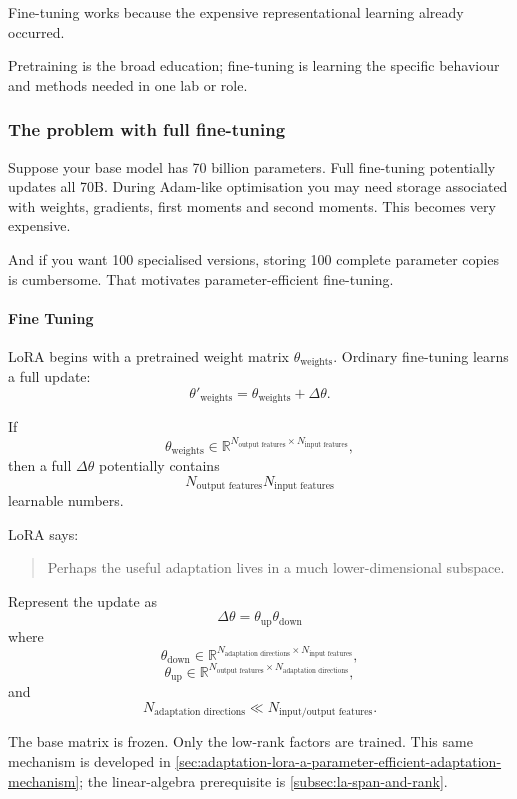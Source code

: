 Fine-tuning works because the expensive representational learning already occurred.

\begin{calloutintuition}
Pretraining is the broad education; fine-tuning is learning the specific behaviour and methods needed in one lab or role.
\end{calloutintuition}

\subsubsection{The problem with full fine-tuning}
\label{subsec:modern-full-ft-cost}
Suppose your base model has 70 billion parameters.
Full fine-tuning potentially updates all 70B.
During Adam-like optimisation you may need storage associated with weights, gradients, first moments and second moments.
This becomes very expensive.

And if you want 100 specialised versions, storing 100 complete parameter copies is cumbersome.
That motivates parameter-efficient fine-tuning.
\paragraph{Fine Tuning}LoRA begins with a pretrained weight matrix $\theta_{\text{weights}}$.
Ordinary fine-tuning learns a full update:
\[
\theta'_{\text{weights}}
=
\theta_{\text{weights}}+\Delta\theta.
\]

If
\[
\theta_{\text{weights}}
\in
\mathbb{R}^{N_{\text{output features}}\times N_{\text{input features}}},
\]
then a full $\Delta\theta$ potentially contains
\[
N_{\text{output features}}N_{\text{input features}}
\]
learnable numbers.

LoRA says:

\begin{quote}
Perhaps the useful adaptation lives in a much lower-dimensional subspace.
\end{quote}

Represent the update as
\[
\boxed{
\Delta\theta
=
\theta_{\text{up}}\theta_{\text{down}}
}
\]
where
\[
\theta_{\text{down}}
\in
\mathbb{R}^{N_{\text{adaptation directions}}\times N_{\text{input features}}},
\]
\[
\theta_{\text{up}}
\in
\mathbb{R}^{N_{\text{output features}}\times N_{\text{adaptation directions}}},
\]
and
\[
N_{\text{adaptation directions}}
\ll
N_{\text{input/output features}}.
\]

The base matrix is frozen.
Only the low-rank factors are trained.
This same mechanism is developed in \cref{sec:adaptation-lora-a-parameter-efficient-adaptation-mechanism}; the linear-algebra prerequisite is \cref{subsec:la-span-and-rank}.

